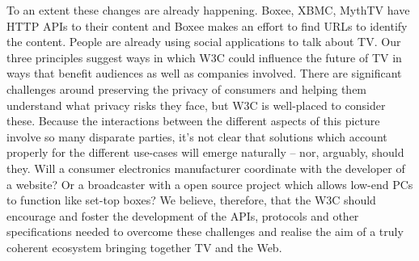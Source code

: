 \documentclass[]{article}%
\begin{document}
To an extent these changes are already happening. Boxee, XBMC, MythTV have HTTP APIs to their content and Boxee makes an effort to find URLs to identify the content. People are already using social applications to talk about TV. Our three principles suggest ways in which W3C could influence the future of TV in ways that benefit audiences as well as companies involved. There are significant challenges around preserving the privacy of consumers and helping them understand what privacy risks they face, but W3C is well-placed to consider these.
Because the interactions between the different aspects of this picture involve so many disparate parties, it's not clear that solutions which account properly for the different use-cases will emerge naturally -- nor, arguably, should they. Will a consumer electronics manufacturer coordinate with the developer of a website? Or a broadcaster with a open source project which allows low-end PCs to function like set-top boxes?
We believe, therefore, that the W3C should encourage and foster the development of the APIs, protocols and other specifications needed to overcome these challenges and realise the aim of a truly coherent ecosystem bringing together TV and the Web. 
\end{document}
